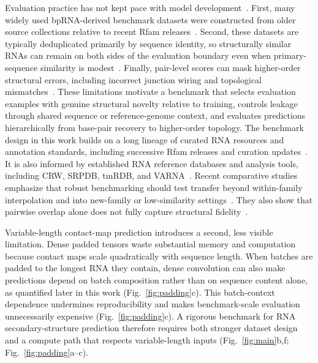 \documentclass[pdflatex,sn-mathphys-num]{sn-jnl}%
\theoremstyle{thmstyleone}%
\theoremstyle{thmstyletwo}%
\theoremstyle{thmstylethree}%
\begin{document}
Evaluation practice has not kept pace with model development~\cite{justyna2023rna,schneider2023when}. 
First, many widely used bpRNA-derived benchmark datasets were constructed from older source collections relative to recent Rfam releases~\cite{danaee2018bprna,ontiveros2025rfam}.
Second, these datasets are typically deduplicated primarily by sequence identity, so structurally similar RNAs can remain on both sides of the evaluation boundary even when primary-sequence similarity is modest~\cite{qiu2023sequence,lasher2025bprna}. 
Finally, pair-level scores can mask higher-order structural errors, including incorrect junction wiring and topological mismatches~\cite{zhao2018evaluation,mathews2019how}. 
These limitations motivate a benchmark that selects evaluation examples with genuine structural novelty relative to training, controls leakage through shared sequence or reference-genome context, and evaluates predictions hierarchically from base-pair recovery to higher-order topology.
The benchmark design in this work builds on a long lineage of curated RNA resources and annotation standards, including successive Rfam releases and curation updates~\cite{kalvari2021rfam,ontiveros2025rfam}. 
It is also informed by established RNA reference databases and analysis tools, including CRW, SRPDB, tmRDB, and VARNA~\cite{cannone2002comparative,rosenblad2003srpdb,zwieb2003tmrdb,darty2009varna}.
Recent comparative studies emphasize that robust benchmarking should test transfer beyond within-family interpolation and into new-family or low-similarity settings~\cite{qiu2023sequence,justyna2023rna,szikszai2022deep}.
They also show that pairwise overlap alone does not fully capture structural fidelity~\cite{zhao2018evaluation,mathews2019how}.

Variable-length contact-map prediction introduces a second, less visible limitation.
Dense padded tensors waste substantial memory and computation because contact maps scale quadratically with sequence length.
When batches are padded to the longest RNA they contain, dense convolution can also make predictions depend on batch composition rather than on sequence content alone, as quantified later in this work (Fig.~\ref{fig:padding}c).
This batch-context dependence undermines reproducibility and makes benchmark-scale evaluation unnecessarily expensive (Fig.~\ref{fig:padding}c).
A rigorous benchmark for RNA secondary-structure prediction therefore requires both stronger dataset design and a compute path that respects variable-length inputs (Fig.~\ref{fig:main}b,f; Fig.~\ref{fig:padding}a--c).
\end{document}
